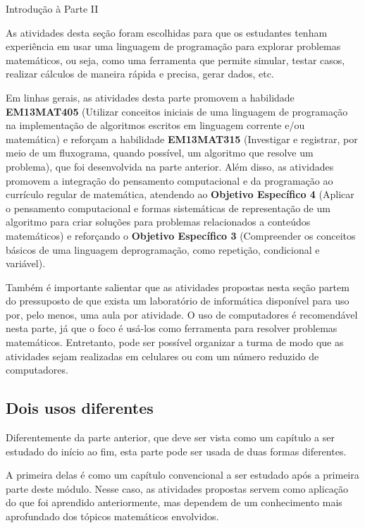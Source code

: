 \begin{apresentacao}{Introdução à Parte II}

As atividades desta seção foram escolhidas para que os estudantes tenham experiência em usar uma linguagem de programação para explorar problemas matemáticos, ou seja, como uma ferramenta que permite simular, testar casos, realizar cálculos de maneira rápida e precisa, gerar dados, etc.

Em linhas gerais, as atividades desta parte promovem a habilidade \textbf{EM13MAT405} (Utilizar conceitos iniciais de uma linguagem de programação na implementação de algoritmos escritos em linguagem corrente e/ou matemática) e reforçam a habilidade \textbf{EM13MAT315} (Investigar e registrar, por meio de um fluxograma, quando possível, um algoritmo que resolve um problema), que foi desenvolvida na parte anterior. Além disso, as atividades promovem a integração do pensamento computacional e da programação ao currículo regular de matemática, atendendo ao \textbf{Objetivo Específico 4} (Aplicar o pensamento computacional e formas sistemáticas de representação de um algoritmo para criar soluções para problemas relacionados a conteúdos matemáticos) e reforçando o \textbf{Objetivo Específico 3} (Compreender os conceitos básicos de uma linguagem deprogramação, como repetição, condicional e variável).

Também é importante salientar que as atividades propostas nesta seção partem do pressuposto de que exista um laboratório de informática disponível para uso por, pelo menos, uma aula por atividade. O uso de computadores é recomendável nesta parte, já que o foco é usá-los como ferramenta para resolver problemas matemáticos. Entretanto, pode ser possível organizar a turma de modo que as atividades sejam realizadas em celulares ou com um número reduzido de computadores.

\subsection{Dois usos diferentes}

Diferentemente da parte anterior, que deve ser vista como um capítulo a ser estudado do início ao fim, esta parte pode ser usada de duas formas diferentes.

A primeira delas é como um capítulo convencional a ser estudado após a primeira parte deste módulo. Nesse caso, as atividades propostas servem como aplicação do que foi aprendido anteriormente, mas dependem de um conhecimento mais aprofundado dos tópicos matemáticos envolvidos.


\end{apresentacao}

